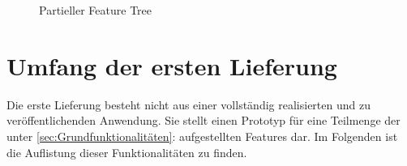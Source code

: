 \documentclass[paper=a4, parskip=half]{scrreprt}
\begin{document}
\begin{figure}[hbt!]
  \centering
  \vspace{-0.25cm}
  \caption[Partieller Feature Tree]{Partieller Feature Tree}
  \label{fig:Bahn-RBC}
\end{figure}


\section{Umfang der ersten Lieferung}

Die erste Lieferung besteht nicht aus einer vollständig realisierten und zu veröffentlichenden Anwendung. Sie stellt einen Prototyp für eine Teilmenge der unter \ref{sec:Grundfunktionalitäten}:  aufgestellten Features dar. Im Folgenden ist die Auflistung dieser Funktionalitäten zu finden.
\end{document}
